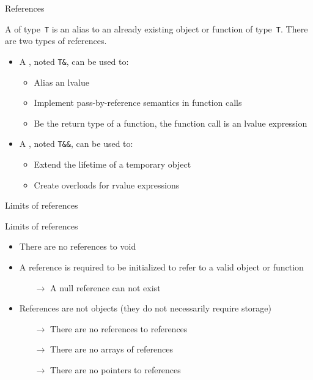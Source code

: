 \begin{frame}{References}{}
  \begin{definitions}[References]
    A  of type~\lstinline!T! is an alias to an already existing object or function of type~\lstinline!T!. There are two types of references.
    \begin{itemize}
    \item
      A , noted \lstinline!T&!, can be used to:
      \begin{itemize}
      \item
        Alias an lvalue
      \item
        Implement pass-by-reference semantics in function calls
      \item
        Be the return type of a function, the function call is an lvalue expression
      \end{itemize}
    \item
      A , noted \lstinline!T&&!, can be used to:
      \begin{itemize}
      \item
        Extend the lifetime of a temporary object
      \item
        Create overloads for rvalue expressions
      \end{itemize}
    \end{itemize}
  \end{definitions}
\end{frame}

\begin{frame}{Limits of references}{}
  \begin{block}{Limits of references}
    \begin{itemize}
    \item
      There are no references to void
    \item
      A reference is required to be initialized to refer to a valid object or function
      \begin{itemize}
      \item[$\to$]
        A null reference can not exist
      \end{itemize}
    \item
      References are not objects (they do not necessarily require storage)
      \begin{itemize}
      \item[$\to$]
        There are no references to references
      \item[$\to$]
        There are no arrays of references
      \item[$\to$]
        There are no pointers to references
      \end{itemize}
    \end{itemize}
  \end{block}
\end{frame}

